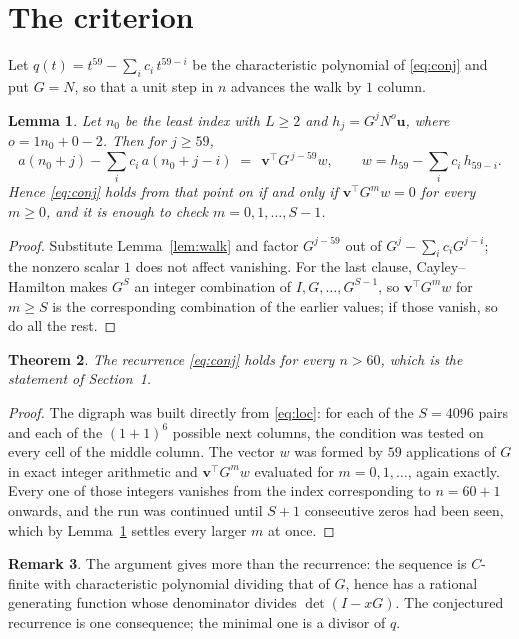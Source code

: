 \documentclass[11pt,a4paper]{article}
\theoremstyle{plain}
\newtheorem{theorem}{Theorem}
\newtheorem{lemma}[theorem]{Lemma}
\theoremstyle{definition}
\newtheorem{remark}[theorem]{Remark}
\begin{document}
\section{The criterion}

Let $q(t)=t^{59}-\sum_i c_i\,t^{59-i}$ be the characteristic polynomial of
\eqref{eq:conj} and put $G=N$, so that a unit step in $n$ advances the walk by
$1$ column.

\begin{lemma}\label{lem:crit}
Let $n_0$ be the least index with $L\ge2$ and $h_j=G^{j}N^{o}\mathbf{u}$, where
$o=1n_0+0-2$. Then for $j\ge59$,
\[
a(n_0+j)-\sum_i c_i\,a(n_0+j-i)\;=\;\,\mathbf{v}^{\!\top}G^{\,j-59}w,
\qquad w=h_{59}-\sum_i c_i\,h_{59-i} .
\]
Hence \eqref{eq:conj} holds from that point on if and only if
$\mathbf{v}^{\!\top}G^{m}w=0$ for every $m\ge0$, and it is enough to check
$m=0,1,\dots,S-1$.
\end{lemma}

\begin{proof}
Substitute Lemma~\ref{lem:walk} and factor $G^{j-59}$ out of
$G^{j}-\sum_ic_iG^{j-i}$; the nonzero scalar $1$ does not affect
vanishing. For the last clause, Cayley--Hamilton makes $G^{S}$ an integer combination of
$I,G,\dots,G^{S-1}$, so $\mathbf{v}^{\!\top}G^{m}w$ for $m\ge S$ is the corresponding
combination of the earlier values; if those vanish, so do all the rest.
\end{proof}

\begin{theorem}
The recurrence \eqref{eq:conj} holds for every $n>60$, which is the statement of
Section~1.
\end{theorem}

\begin{proof}
The digraph was built directly from \eqref{eq:loc}: for each of the $S=4096$ pairs and each
of the $(1+1)^{6}$ possible next columns, the condition was tested on every cell of
the middle column. The vector $w$ was formed by $59$ applications of $G$ in exact integer
arithmetic and $\mathbf{v}^{\!\top}G^{m}w$ evaluated for $m=0,1,\dots$, again exactly.
Every one of those integers vanishes from the index corresponding to $n=60+1$ onwards,
and the run was continued until $S+1$ consecutive zeros had been seen, which by
Lemma~\ref{lem:crit} settles every larger $m$ at once.
\end{proof}

\begin{remark}
The argument gives more than the recurrence: the sequence is $C$-finite with characteristic
polynomial dividing that of $G$, hence has a rational generating function whose denominator
divides $\det(I-xG)$. The conjectured recurrence is one consequence; the minimal one is a
divisor of $q$.
\end{remark}
\end{document}
